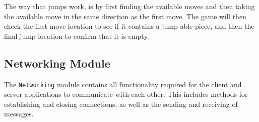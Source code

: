\documentclass[letterpaper]{article}
\begin{document}
The way that jumps work, is by first finding the available moves
and then taking the available move in the same direction as the
first move. The game will then check the first move location to
see if it contains a jump-able piece, and then the final jump
location to confirm that it is empty.


\subsection{Networking Module}
\label{sec:architecture_system2}

The \texttt{Networking} module contains all functionality
required for the client and server applications to communicate
with each other. This includes methods for establishing and
closing connections, as well as the sending and receiving of
messages.
\end{document}
